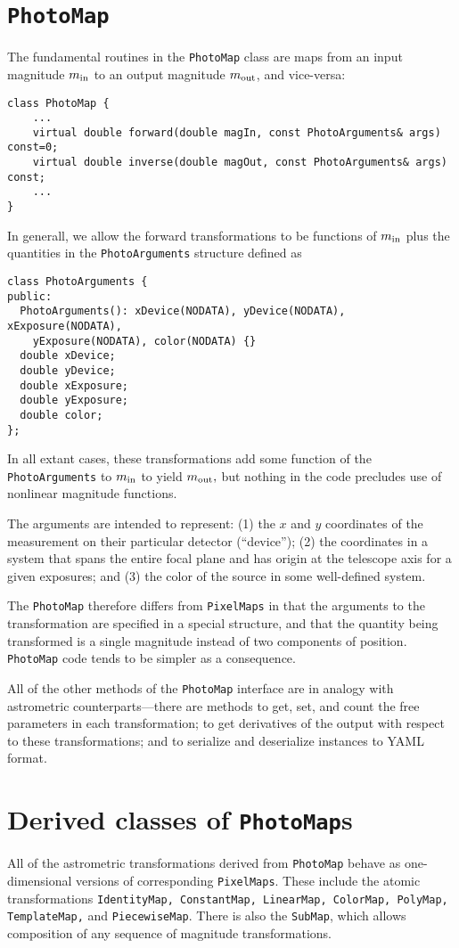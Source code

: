 \documentclass[11pt,preprint,flushrt]{aastex}
\begin{document}
\section{{\tt PhotoMap}}
The fundamental routines in the \texttt{PhotoMap} class are maps from an input magnitude $m_{\rm in}$ to an output magnitude $m_{\rm out}$, and vice-versa:
\begin{verbatim}
class PhotoMap {
    ...
    virtual double forward(double magIn, const PhotoArguments& args) const=0;
    virtual double inverse(double magOut, const PhotoArguments& args) const;
    ...
}
\end{verbatim}
In generall, we allow the forward transformations to be functions of $m_{\rm in}$ plus the quantities in the \texttt{PhotoArguments} structure defined as
\begin{verbatim}
class PhotoArguments {
public:
  PhotoArguments(): xDevice(NODATA), yDevice(NODATA), xExposure(NODATA),
    yExposure(NODATA), color(NODATA) {}
  double xDevice;
  double yDevice;
  double xExposure;
  double yExposure;
  double color;
};
\end{verbatim}
In all extant cases, these transformations add some function of the \texttt{PhotoArguments} to $m_{\rm in}$ to yield $m_{\rm out},$ but nothing in the code precludes use of nonlinear magnitude functions.

The arguments are intended to represent: (1) the $x$ and $y$ coordinates of the measurement on their particular detector (``device''); (2) the coordinates in a system that spans the entire focal plane and has origin at the telescope axis for a given exposures; and (3) the color of the source in some well-defined system.

The \texttt{PhotoMap} therefore differs from \texttt{PixelMaps} in that the arguments to the transformation are specified in a special structure, and that the quantity being transformed is a single magnitude instead of two components of position.  \texttt{PhotoMap} code tends to be simpler as a consequence.

All of the other methods of the \texttt{PhotoMap} interface are in analogy with astrometric counterparts---there are methods to get, set, and count the free parameters in each transformation; to get derivatives of the output with respect to these transformations; and to serialize and deserialize instances to YAML format.

\section{Derived classes of {\tt PhotoMap}s}
All of the astrometric transformations derived from \texttt{PhotoMap} behave as one-dimensional versions of corresponding \texttt{PixelMaps}.  These include the atomic transformations \texttt{IdentityMap, ConstantMap, LinearMap, ColorMap, PolyMap, TemplateMap,} and \texttt{PiecewiseMap}.  There is also the \texttt{SubMap}, which allows composition of any sequence of magnitude transformations.
\end{document}

